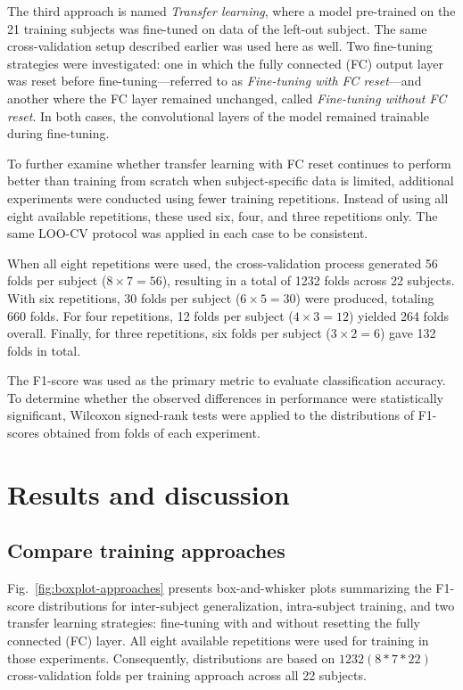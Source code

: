 \begin{multicols}{2}
The third approach is named \textit{Transfer learning}, where a model pre-trained on the 21 training subjects was fine-tuned on data of the left-out subject. The same cross-validation setup described earlier was used here as well. Two fine-tuning strategies were investigated: one in which the fully connected (FC) output layer was reset before fine-tuning—referred to as \textit{Fine-tuning with FC reset}—and another where the FC layer remained unchanged, called \textit{Fine-tuning without FC reset}. In both cases, the convolutional layers of the model remained trainable during fine-tuning.

To further examine whether transfer learning with FC reset continues to perform better than training from scratch when subject-specific data is limited, additional experiments were conducted using fewer training repetitions. Instead of using all eight available repetitions, these used six, four, and three repetitions only. The same LOO-CV protocol was applied in each case to be consistent.

When all eight repetitions were used, the cross-validation process generated 56 folds per subject ($8 \times 7 = 56$), resulting in a total of 1232 folds across 22 subjects. With six repetitions, 30 folds per subject ($6 \times 5 = 30$) were produced, totaling 660 folds. For four repetitions, 12 folds per subject ($4 \times 3 = 12$) yielded 264 folds overall. Finally, for three repetitions, six folds per subject ($3 \times 2 = 6$) gave 132 folds in total.

The F1-score was used as the primary metric to evaluate classification accuracy. To determine whether the observed differences in performance were statistically significant, Wilcoxon signed-rank tests were applied to the distributions of F1-scores obtained from folds of each experiment.

\section{Results and discussion}


\subsection*{Compare training approaches}

Fig.~\ref{fig:boxplot-approaches} presents box-and-whisker plots summarizing the F1-score distributions for inter-subject generalization, intra-subject training, and two transfer learning strategies: fine-tuning with and without resetting the fully connected (FC) layer. All eight available repetitions were used for training in those experiments. Consequently, distributions are based on $1232 (8*7*22)$ cross-validation folds per training approach across all 22 subjects.


\end{multicols}
